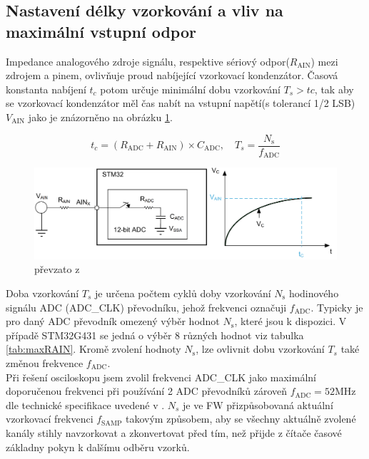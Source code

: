 \newpage
\subsection{Nastavení délky vzorkování a vliv na maximální vstupní odpor}\label{Ch:SamplingTimeAndMaxInputRes}
Impedance analogového zdroje signálu, respektive sériový odpor($R_\text{AIN}$) mezi zdrojem a pinem, ovlivňuje proud nabíjející vzorkovací kondenzátor. Časová konstanta nabíjení $t_c$ potom určuje minimální dobu vzorkování $T_s>tc$, tak aby se vzorkovací kondenzátor měl čas nabít  na vstupní napětí(s tolerancí 1/2 LSB) $V_\text{AIN}$ jako je znázorněno na obrázku \ref{fig:samplingtimeandmaxinputresistance}. 

\begin{equation}
	t_c=(R_\text{ADC}+R_\text{AIN})\times C_\text{ADC}, \quad T_s=\frac{N_{\text{s}}}{f_\text{ADC}} 
	\label{eq:RAIN}
\end{equation}


\begin{figure}[H]
	\centering
	\includegraphics[width=0.9\linewidth]{Figs/Diagrams/SamplingTimeAndMaxInputResistance}
	\caption{ převzato z \cite{ADC_Acuraccy}}
	\label{fig:samplingtimeandmaxinputresistance}
\end{figure}

Doba vzorkování $T_s$ je určena počtem cyklů doby vzorkování $N_{\text{s}}$ hodinového signálu ADC (ADC\_CLK) převodníku, jehož frekvenci označuji $f_\text{ADC}$. Typicky je pro daný ADC převodník omezený výběr hodnot $N_{\text{s}}$, které jsou k dispozici. V případě STM32G431 se jedná o výběr 8 různých hodnot viz tabulka \ref{tab:maxRAIN}. Kromě zvolení hodnoty $N_{\text{s}}$, lze ovlivnit dobu vzorkování  $T_s$ také změnou frekvence $f_\text{ADC}$.\\

Při řešení osciloskopu jsem zvolil frekvenci ADC\_CLK jako maximální doporučenou frekvenci při používání 2 ADC převodníků zároveň $f_\text{ADC}=52$MHz dle technické specifikace uvedené v \cite{dataG431}. $N_s$ je ve FW přizpůsobovaná aktuální vzorkovací frekvenci $f_{\text{SAMP}}$ takovým způsobem, aby se všechny aktuálně zvolené kanály stihly navzorkovat a zkonvertovat před tím, než přijde z čítače časové základny pokyn k dalšímu odběru vzorků.\\

